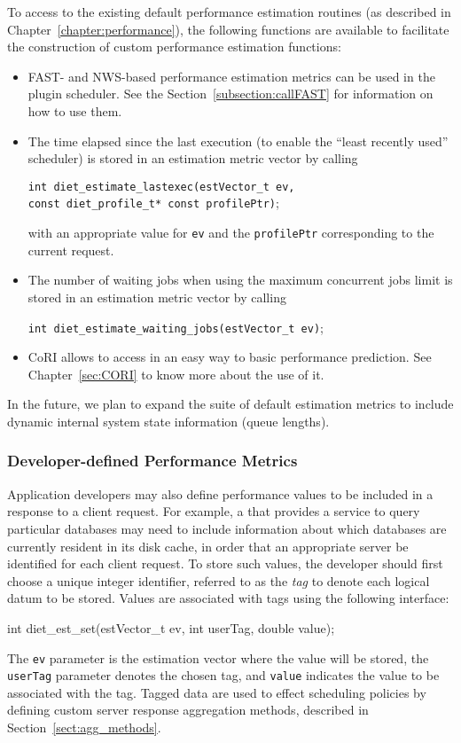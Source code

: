 To access to the existing default performance estimation routines (as described
in Chapter~\ref{chapter:performance}), the following functions are available to
facilitate the construction of custom performance estimation functions:
\begin{itemize}
\item FAST- and NWS-based performance estimation metrics can be used in the
  plugin scheduler. See the Section~\ref{subsection:callFAST} for information
  on how to use them.
\item The time elapsed since the last execution (to enable the ``least recently used''
  scheduler) is stored in an estimation metric vector by calling
  \begin{tabbing}
    \texttt{int diet\_estimate\_lastexec(}\=\texttt{estVector\_t ev,} \\
    \> \texttt{const diet\_profile\_t* const profilePtr)};
  \end{tabbing}
  with an appropriate value for \texttt{ev} and the \texttt{profilePtr}
  corresponding to the current \diet request.
\item The number of waiting jobs when using the maximum concurrent jobs limit
  is stored in an estimation metric vector by calling
  \begin{tabbing}
    \texttt{int diet\_estimate\_waiting\_jobs(}\=\texttt{estVector\_t ev)};
  \end{tabbing}
\item CoRI allows to access in an easy way to basic performance
  prediction. See Chapter~\ref{sec:CORI} to know more about the use of it.
\end{itemize}

In the future, we plan to expand the suite of default estimation metrics to
include dynamic internal \diet system state information (\eg queue lengths).

\subsubsection{Developer-defined Performance Metrics}

Application developers may also define performance values to be included in a
\sed response to a client request.  For example, a \diet \sed that provides a
service to query particular databases may need to include information about
which databases are currently resident in its disk cache, in order that an
appropriate server be identified for each client request.  To store such
values, the \sed developer should first choose a unique integer identifier,
referred to as the \emph{tag} to denote each logical datum to be stored.
Values are associated with tags using the following interface:
\begin{code}
int diet\_est\_set(estVector\_t ev, int userTag, double value);
\end{code}
The \texttt{ev} parameter is the estimation vector where the value will be
stored, the \texttt{userTag} parameter denotes the chosen tag, and
\texttt{value} indicates the value to be associated with the tag.  Tagged data
are used to effect scheduling policies by defining custom server response
aggregation methods, described in Section~\ref{sect:agg_methods}.

